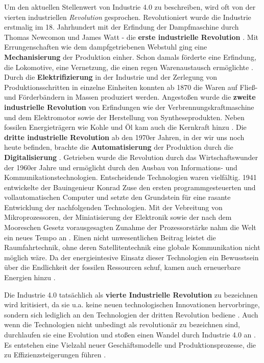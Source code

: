 Um den aktuellen Stellenwert von Industrie 4.0 zu beschreiben, wird oft von der vierten industriellen \textit{Revolution} gesprochen. Revolutioniert wurde die Industrie erstmalig im 18. Jahrhundert mit der Erfindung der Dampfmaschine durch Thomas Newcomon und James Watt - die \textbf{erste industrielle Revolution} \citep{Roth2016}. Mit Errungenschaften wie dem dampfgetriebenen Webstuhl ging eine \textbf{Mechanisierung }der Produktion einher. Schon damals förderte eine Erfindung, die Lokomotive, eine Vernetzung, die einen regen Warenaustausch ermöglichte \citep{Barthelmaes2017}.
Durch die \textbf{Elektrifizierung} in der Industrie und der Zerlegung von Produktionsschritten in einzelne Einheiten konnten ab 1870 die Waren auf Fließ- und Förderbändern in Massen produziert werden. Angestoßen wurde die \textbf{zweite industrielle Revolution} von Erfindungen wie der Verbrennungskraftmaschine und dem Elektromotor sowie der Herstellung von Syntheseprodukten. Neben fossilen Energieträgern wie Kohle und Öl kam auch die Kernkraft hinzu \citep{Barthelmaes2017}.
Die \textbf{dritte industrielle Revolution} ab den 1970er Jahren, in der wir uns noch heute befinden,  brachte die \textbf{Automatisierung} der Produktion durch die \textbf{Digitalisierung} \citep{Voigt2018}. Getrieben wurde die Revolution durch das Wirtschaftswunder der 1960er Jahre \citep{Roth2016} und ermöglicht durch den Ausbau von Informations- und Kommunikationstechnologien. Entscheidende Technologien waren vielfältig. 1941 entwickelte der Bauingenieur Konrad Zuse den ersten programmgesteuerten und vollautomatischen Computer und setzte den Grundstein für eine rasante Entwicklung der nachfolgenden Technologien. Mit der Vebreitung von Mikroprozessoren, der Miniatisierung der Elektronik sowie der nach dem Mooreschen Gesetz vorausgesagten Zunahme der Prozessorstärke nahm die Welt ein neues Tempo an \citep{Sendler2016}. Einen nicht unwesentlichen Beitrag leistet die Raumfahrtechnik, ohne deren Satellitentechnik eine globale Kommunikation nicht möglich wäre. Da der energieintesive Einsatz dieser Technologien ein Bewusstsein über die Endlichkeit der fossilen Ressourcen schuf, kamen auch erneuerbare Energien hinzu \citep{Barthelmaes2017}.

Die Industrie 4.0 tatsächlich als \textbf{vierte Industrielle Revolution} zu bezeichnen wird kritisiert, da sie u.a. keine neuen technologischen Innovationen hervorbringe, sondern sich lediglich an den Technologien der dritten Revolution bediene \citep{Barthelmaes2017}. Auch wenn die Technologien nicht unbedingt als revolutionär zu bezeichnen sind, durchlaufen sie eine Evolution und stoßen einen Wandel durch Industrie 4.0 an \citep{Roth2016}. Es entstehen eine Vielzahl neuer Geschäftsmodelle und Produktionsprozesse, die zu Effizienzsteigerungen führen \citep{BITKOM2015}.

